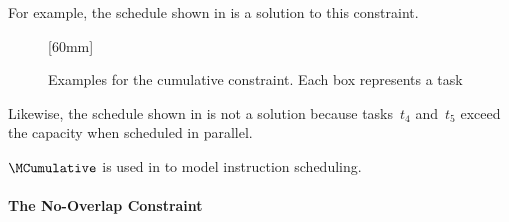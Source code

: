 For example, the schedule shown in  is a
\gls{solution} to this \gls{constraint}.
%
\begin{figure}
                {%
                }%
  \hfill%
                [60mm]%
                {%
                }

  \caption[Examples to illustrate the cumulative constraint]%
          {%
            Examples for the cumulative constraint.
            Each box represents a task%
          }
\end{figure}
%
Likewise, the schedule shown in  is not a
\gls{solution} because tasks~$t_4$ and~$t_5$ exceed the capacity when scheduled
in parallel.

$\MCumulative$ is used in  to model
\gls{instruction scheduling}.


\paragraph{The No-Overlap Constraint}

